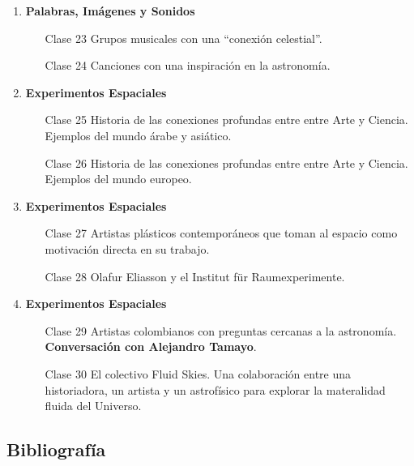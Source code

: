 \documentclass{report}
\begin{document}
\begin{enumerate}
\item {\bf Palabras, Im\'agenes y Sonidos}
\begin{itemize}
\item[Clase 23] Grupos musicales con una ``conexi\'on celestial''.
\item[Clase 24] Canciones con una inspiraci\'on en la astronom\'ia. 
\end{itemize}

\item {\bf Experimentos Espaciales}
\begin{itemize}
\item[Clase 25] Historia de las conexiones profundas entre entre Arte
  y Ciencia. Ejemplos del mundo \'arabe y asi\'atico.
\item[Clase 26] Historia de las conexiones profundas entre entre Arte
  y Ciencia. Ejemplos del mundo europeo. 
\end{itemize}

\item {\bf Experimentos Espaciales}
\begin{itemize}
\item[Clase 27] Artistas pl\'asticos contempor\'aneos que toman al espacio como
  motivaci\'on directa en su trabajo.
\item[Clase 28] Olafur Eliasson y el Institut f\"ur Raumexperimente.
\end{itemize}

\item {\bf Experimentos Espaciales}
\begin{itemize}
\item[Clase 29] Artistas colombianos con preguntas cercanas a la
  astronom\'ia. {\bf Conversaci\'on con Alejandro Tamayo}.
\item[Clase 30] El colectivo Fluid Skies. Una colaboraci\'on entre una
  historiadora, un artista y un astrof\'isico para explorar la
  materalidad fluida del Universo.
\end{itemize}

\end{enumerate}



\subsection*{Bibliografía}
\end{document}
